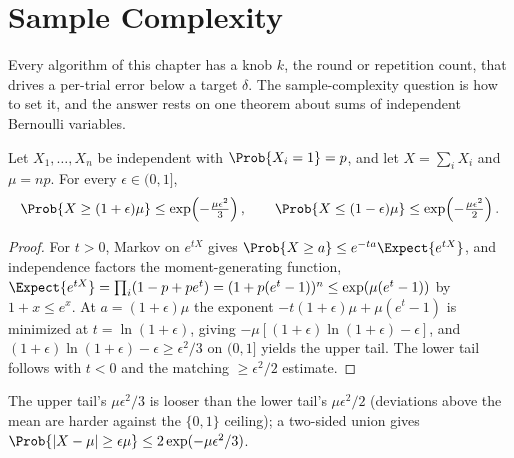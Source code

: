 %

\section{Sample Complexity}
\label{sec:sample-complexity}

Every algorithm of this chapter has a knob $k$, the round or repetition count,
that drives a per-trial error below a target $\delta$. The sample-complexity
question is how to set it, and the answer rests on one theorem about sums of
independent Bernoulli variables.

\begin{theorem}
\label{thm:chernoff}
Let $X_1, \ldots, X_n$ be independent with $\Prob{X_i = 1} = p$, and let $X =
\sum_i X_i$ and $\mu = np$. For every $\epsilon \in (0, 1]$,
\[
  \Prob{X \ge (1 + \epsilon)\mu} \le \exp\!\left(-\tfrac{\mu\epsilon^2}{3}\right),
  \qquad
  \Prob{X \le (1 - \epsilon)\mu} \le \exp\!\left(-\tfrac{\mu\epsilon^2}{2}\right).
\]
\end{theorem}

\begin{proof}
For $t > 0$, Markov on $e^{tX}$ gives $\Prob{X \ge a} \le e^{-ta}\Expect{e^{tX}}$,
and independence factors the moment-generating function, $\Expect{e^{tX}} =
\prod_i(1 - p + pe^t) = (1 + p(e^t - 1))^n \le \exp(\mu(e^t - 1))$ by $1 + x \le
e^x$. At $a = (1 + \epsilon)\mu$ the exponent $-t(1 + \epsilon)\mu + \mu(e^t - 1)$
is minimized at $t = \ln(1 + \epsilon)$, giving $-\mu[(1 + \epsilon)\ln(1 +
\epsilon) - \epsilon]$, and $(1 + \epsilon)\ln(1 + \epsilon) - \epsilon \ge
\epsilon^2/3$ on $(0,1]$ yields the upper tail. The lower tail follows with $t <
0$ and the matching $\ge \epsilon^2/2$ estimate.
\end{proof}

The upper tail's $\mu\epsilon^2/3$ is looser than the lower tail's
$\mu\epsilon^2/2$ (deviations above the mean are harder against the $\{0,1\}$
ceiling); a two-sided union gives $\Prob{|X - \mu| \ge \epsilon\mu} \le
2\exp(-\mu\epsilon^2/3)$.

